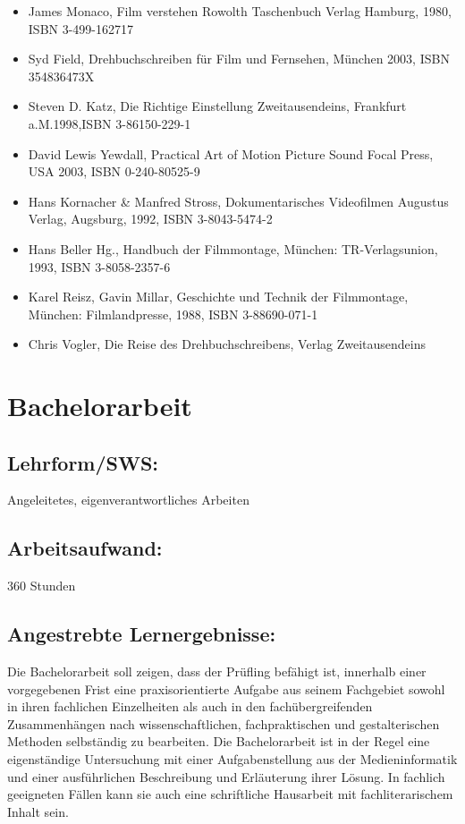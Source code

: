 \begin{itemize}
\tightlist
\item
  James Monaco, Film verstehen Rowolth Taschenbuch Verlag Hamburg, 1980,
  ISBN 3-499-162717
\item
  Syd Field, Drehbuchschreiben für Film und Fernsehen, München 2003,
  ISBN 354836473X
\item
  Steven D. Katz, Die Richtige Einstellung Zweitausendeins, Frankfurt
  a.M.1998,ISBN 3-86150-229-1
\item
  David Lewis Yewdall, Practical Art of Motion Picture Sound Focal
  Press, USA 2003, ISBN 0-240-80525-9
\item
  Hans Kornacher \& Manfred Stross, Dokumentarisches Videofilmen
  Augustus Verlag, Augsburg, 1992, ISBN 3-8043-5474-2
\item
  Hans Beller Hg., Handbuch der Filmmontage, München: TR-Verlagsunion,
  1993, ISBN 3-8058-2357-6
\item
  Karel Reisz, Gavin Millar, Geschichte und Technik der Filmmontage,
  München: Filmlandpresse, 1988, ISBN 3-88690-071-1
\item
  Chris Vogler, Die Reise des Drehbuchschreibens, Verlag Zweitausendeins
\end{itemize}

\chapter{Bachelorarbeit}\label{bachelorarbeit}

\section{Lehrform/SWS:}\label{lehrformsws-3}

Angeleitetes, eigenverantwortliches Arbeiten

\section{Arbeitsaufwand:}\label{arbeitsaufwand-3}

360 Stunden

\section{Angestrebte
Lernergebnisse:}\label{angestrebte-lernergebnisse-3}

Die Bachelorarbeit soll zeigen, dass der Prüfling befähigt ist,
innerhalb einer vorgegebenen Frist eine praxisorientierte Aufgabe aus
seinem Fachgebiet sowohl in ihren fachlichen Einzelheiten als auch in
den fachübergreifenden Zusammenhängen nach wissenschaftlichen,
fachpraktischen und gestalterischen Methoden selbständig zu bearbeiten.
Die Bachelorarbeit ist in der Regel eine eigenständige Untersuchung mit
einer Aufgabenstellung aus der Medieninformatik und einer ausführlichen
Beschreibung und Erläuterung ihrer Lösung. In fachlich geeigneten Fällen
kann sie auch eine schriftliche Hausarbeit mit fachliterarischem Inhalt
sein.

